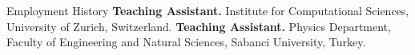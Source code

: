 \begin{rubric}{Employment History}
%
	\textbf{Teaching Assistant.} Institute for Computational Sciences, University of Zurich, Switzerland.
%
%
\entry*[2014 -- 2016]%
	\textbf{Teaching Assistant.} Physics Department, Faculty of Engineering and Natural Sciences, Sabanci University, Turkey.
%
\end{rubric}